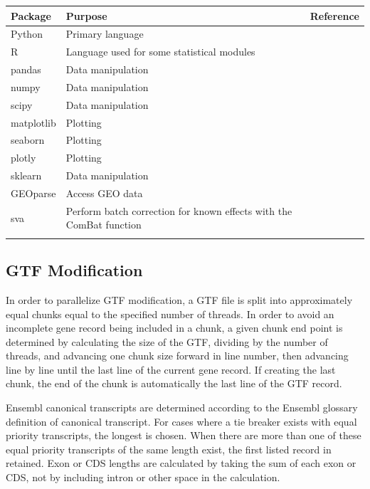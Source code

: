 \documentclass[11pt, a4paper, oneside]{article}
\begin{document}
\begin{tabular}{p{2.4cm}p{7.5cm}p{3cm}}
 \textbf{Package} & \textbf{Purpose} & \textbf{Reference} \\
 \hline
 Python & Primary language & \\
 \hline
 R & Language used for some statistical modules & \\
 \hline
 pandas & Data manipulation & \cite{pandas} \\
 \hline
 numpy & Data manipulation & \cite{numpy1, numpy2} \\
 \hline
 scipy & Data manipulation & \cite{scipy} \\
 \hline
 matplotlib & Plotting & \cite{matplotlib} \\
 \hline
 seaborn & Plotting & \cite{seaborn} \\
 \hline
 plotly & Plotting & \cite{plotly} \\
 \hline
 sklearn & Data manipulation & \cite{sklearn} \\
 \hline
 GEOparse & Access GEO data & \cite{geoparse} \\
 \hline
 sva & Perform batch correction for known effects with the ComBat function & \cite{sva} \\
 \label{Tab:software_plot}
 \end{tabular}
 \newline

\subsection{GTF Modification}
In order to parallelize GTF modification, a GTF file is split into approximately equal chunks equal to the specified number of threads. In order to avoid an incomplete gene record being included in a chunk, a given chunk end point is determined by calculating the size of the GTF, dividing by the number of threads, and advancing one chunk size forward in line number, then advancing line by line until the last line of the current gene record. If creating the last chunk, the end of the chunk is automatically the last line of the GTF record. \par

Ensembl canonical transcripts are determined according to the Ensembl glossary definition of canonical transcript. For cases where a tie breaker exists with equal priority transcripts, the longest is chosen. When there are more than one of these equal priority transcripts of the same length exist, the first listed record in retained. Exon or CDS lengths are calculated by taking the sum of each exon or CDS, not by including intron or other space in the calculation. \par
\end{document}
